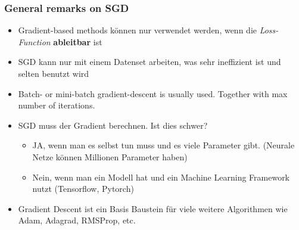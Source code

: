 \subsubsection{General remarks on SGD}
\begin{itemize}
    \item Gradient-based methods können nur verwendet werden, wenn die \textit{Loss-Function} \textbf{ableitbar} ist
    \item SGD kann nur mit einem Datenset arbeiten, was sehr ineffizient ist und selten benutzt wird
    \item Batch- or mini-batch gradient-descent is usually used. Together with max number of iterations.
    \item SGD muss der Gradient berechnen. Ist dies schwer?
    \begin{itemize}
        \item JA, wenn man es selbst tun muss und es viele Parameter gibt. (Neurale Netze können Millionen Parameter haben)
        \item Nein, wenn man ein Modell hat und ein Machine Learning Framework nutzt (Tensorflow, Pytorch)
    \end{itemize}
    \item Gradient Descent ist ein Basis Baustein für viele weitere Algorithmen wie Adam, Adagrad, RMSProp, etc.
\end{itemize}